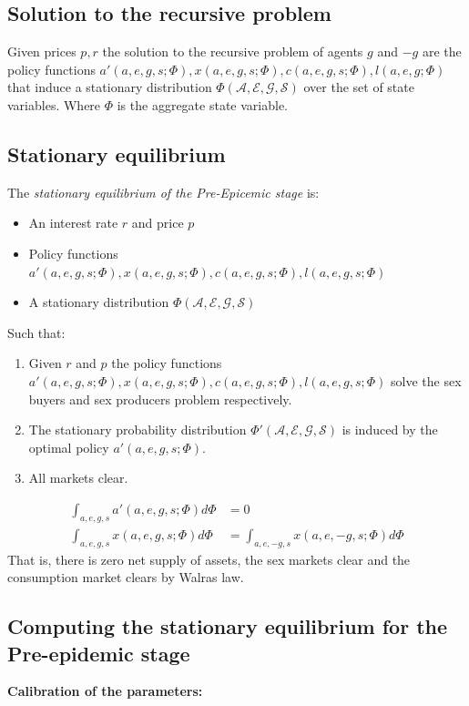  \subsection*{Solution to the recursive problem}
 Given prices $p,r$ the solution to the recursive problem of agents $g$ and $-g$  are the policy functions $a'(a,e,g,s;\Phi), x(a,e,g,s;\Phi), c(a,e,g,s;\Phi), l(a,e,g;\Phi)$ that induce a stationary distribution $\Phi(\mathcal{A,E,G,S})$ over the set of state variables. Where $\Phi$ is the aggregate state variable.
 \subsection*{Stationary equilibrium}
 The \textit{stationary equilibrium of the Pre-Epicemic stage} is:
 \begin{itemize}
 \item An interest rate $r$ and price $p$
 \item Policy functions $a'(a,e,g,s;\Phi), x(a,e,g,s;\Phi), c(a,e,g,s;\Phi), l(a,e,g,s;\Phi)$
 \item A stationary distribution $\Phi(\mathcal{A,E,G,S}) $
 \end{itemize}
 Such that:
 \begin{enumerate}[label=\alph*]
 \item Given $r$ and $p$ the policy functions  $a'(a,e,g,s;\Phi), x(a,e,g,s;\Phi), c(a,e,g,s;\Phi), l(a,e,g,s;\Phi)$ solve the sex buyers and sex producers problem respectively.
 \item The stationary probability distribution $\Phi'(\mathcal{A,E,G,S})$ is induced by the optimal policy $a'(a,e,g,s;\Phi)$.
 \item All markets clear.
  \end{enumerate}
 \begin{align*}
\int_{a,e,g,s} a'(a,e,g,s;\Phi) d\Phi &= 0 \\
\int_{a,e,g,s} x(a,e,g,s;\Phi) d \Phi &= \int_{a,e,-g,s} x(a,e,-g,s;\Phi) d\Phi
\end{align*}
That is, there is zero net supply of assets, the sex markets clear and the consumption market clears by Walras law.
\subsection*{Computing the stationary equilibrium for the Pre-epidemic stage}
\noindent \textbf{Calibration of the parameters:}\\


